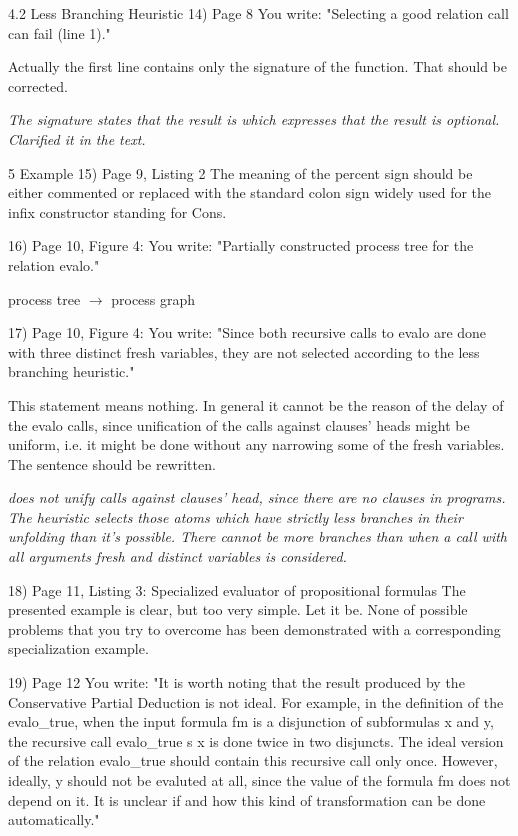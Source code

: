 4.2 Less Branching Heuristic
14) Page 8
You write: "Selecting a good relation call can fail (line 1)."

Actually the first line contains only the signature of the function. That should be corrected.

\emph{The signature states that the result is  which expresses that the result is optional. Clarified it in the text.}

5 Example
15) Page 9, Listing 2
The meaning of the percent sign should be either commented or replaced with the standard colon sign widely used for the infix constructor standing for Cons.

16) Page 10, Figure 4:
You write: "Partially constructed process tree for the relation evalo."

process tree $\rightarrow$ process graph

17) Page 10, Figure 4:
You write: "Since both recursive calls to evalo are done with three distinct fresh variables, they are not selected according to the less branching heuristic."

This statement means nothing. In general it cannot be the reason of the delay of the evalo calls, since unification of the calls against clauses' heads might be uniform, i.e. it might be done without any narrowing some of the fresh variables. The sentence should be rewritten.

\emph{\mk does not unify calls against clauses' head, since there are no clauses in \mk programs. The heuristic selects those atoms which have strictly less branches in their unfolding than it's possible. There cannot be more branches than when a call with all arguments fresh and distinct variables is considered.}


18) Page 11, Listing 3: Specialized evaluator of propositional formulas
The presented example is clear, but too very simple. Let it be. None of possible problems that you try to overcome has been demonstrated with a corresponding specialization example.


19) Page 12
You write: "It is worth noting that the result produced by the Conservative Partial Deduction is not ideal. For example, in the definition of the evalo_true, when the input formula fm is a disjunction of subformulas x and y, the recursive call evalo_true s x is done twice in two disjuncts. The ideal version of the relation evalo_true should contain this recursive call only once. However, ideally, y should not be evaluted at all, since the value of the formula fm does not depend on it. It is unclear if and how this kind of transformation can be done automatically."

